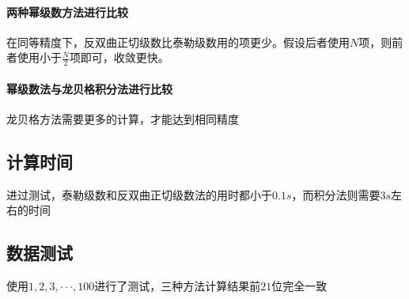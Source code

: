 \documentclass[UTF8,twocolum,titlepage]{ctexart}
\begin{document}
\paragraph{两种幂级数方法进行比较}
在同等精度下，反双曲正切级数比泰勒级数用的项更少。假设后者使用$N$项，则前者使用小于$\frac{N}{2}$项即可，收敛更快。
\paragraph{幂级数法与龙贝格积分法进行比较}
龙贝格方法需要更多的计算，才能达到相同精度
\subsection*{计算时间}
进过测试，泰勒级数和反双曲正切级数法的用时都小于$0.1s$，而积分法则需要$3s$左右的时间
\subsection*{数据测试}
使用$1,2,3,\cdot\cdot\cdot,100$进行了测试，三种方法计算结果前$21$位完全一致
\newpage
\renewcommand\refname{参考文献}


\end{document}
